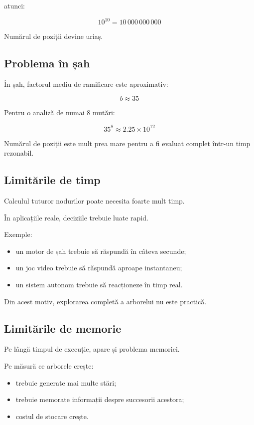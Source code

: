 \documentclass[12pt,a4paper]{article}
\begin{document}
atunci:

\[
10^{10}
=
10\,000\,000\,000
\]

Numărul de poziții devine uriaș.

\subsection{Problema în șah}

În șah, factorul mediu de ramificare este aproximativ:

\[
b \approx 35
\]

Pentru o analiză de numai 8 mutări:

\[
35^8
\approx
2.25 \times 10^{12}
\]

Numărul de poziții este mult prea mare pentru a fi evaluat complet într-un timp rezonabil.

\subsection{Limitările de timp}

Calculul tuturor nodurilor poate necesita foarte mult timp.

În aplicațiile reale, deciziile trebuie luate rapid.

Exemple:

\begin{itemize}
\item un motor de șah trebuie să răspundă în câteva secunde;
\item un joc video trebuie să răspundă aproape instantaneu;
\item un sistem autonom trebuie să reacționeze în timp real.
\end{itemize}

Din acest motiv, explorarea completă a arborelui nu este practică.

\subsection{Limitările de memorie}

Pe lângă timpul de execuție, apare și problema memoriei.

Pe măsură ce arborele crește:

\begin{itemize}
\item trebuie generate mai multe stări;
\item trebuie memorate informații despre succesorii acestora;
\item costul de stocare crește.
\end{itemize}
\end{document}
